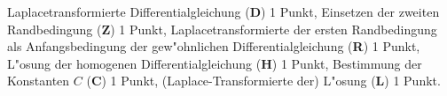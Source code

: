 
\begin{bewertung}
Laplacetransformierte Differentialgleichung ({\bf D}) 1 Punkt,
Einsetzen der zweiten Randbedingung ({\bf Z}) 1 Punkt,
Laplacetransformierte der ersten Randbedingung als Anfangsbedingung
der gew"ohnlichen Differentialgleichung ({\bf R}) 1 Punkt,
L"osung der homogenen Differentialgleichung ({\bf H}) 1 Punkt,
Bestimmung der Konstanten $C$ ({\bf C}) 1 Punkt,
(Laplace-Transformierte der) L"osung ({\bf L}) 1 Punkt.
\end{bewertung}
